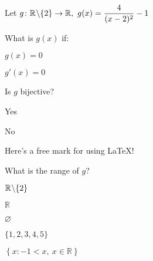 \documentclass[a4paper]{article}
\begin{document}
\begin{question}{7}
    Let $\displaystyle
    g\colon \mathbb{R}\hspace{0.05em}\backslash \{2\}\to \mathbb{R},~ g(x) = \frac{4}{(x-2)^{2}} - 1$
    \begin{subquestion}{\undefined}
        What is $g(x)$ if:
        \begin{subsubquestion}{1}
            $g(x) = 0$
            \shortanswer
        \end{subsubquestion}
        \begin{subsubquestion}{2}
            $\displaystyle
                g'(x) = 0
            $
        \end{subsubquestion}
    \end{subquestion}
    \begin{subquestion}{1}
        Is $g$ bijective?
        \begin{multiplechoice}
        \item Yes
        \item No
        \end{multiplechoice}
    \end{subquestion}
    \begin{subquestion}{1}
        Here's a free mark for using \LaTeX !
    \end{subquestion}
    \begin{subquestion}{2}
        What is the range of $g$?
        \begin{multiplechoice}
            \item $\mathbb{R}\hspace{0.05em}\backslash \{2\}$
            \item $\mathbb{R}$
            \item $\varnothing$
            \item $\{1, 2, 3, 4, 5\}$
            \item $\left\{x\colon -1 < x,~ x \in \mathbb{R}\right\}$
        \end{multiplechoice}
    \end{subquestion}
\end{question}
\end{document}
